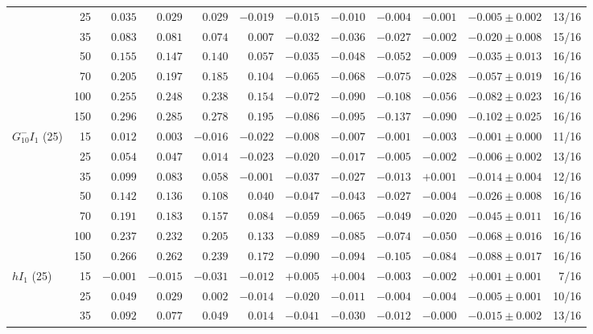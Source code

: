 \begin{tabular}{lrrrrrrrrrrr}
 & 25 & $0.035$ & $0.029$ & $0.029$ & $-0.019$ & $-0.015$ & $-0.010$ & $-0.004$ & $-0.001$ & $-0.005 \pm 0.002$ & 13/16 \\
 & 35 & $0.083$ & $0.081$ & $0.074$ & $0.007$ & $-0.032$ & $-0.036$ & $-0.027$ & $-0.002$ & $-0.020 \pm 0.008$ & 15/16 \\
 & 50 & $0.155$ & $0.147$ & $0.140$ & $0.057$ & $-0.035$ & $-0.048$ & $-0.052$ & $-0.009$ & $-0.035 \pm 0.013$ & 16/16 \\
 & 70 & $0.205$ & $0.197$ & $0.185$ & $0.104$ & $-0.065$ & $-0.068$ & $-0.075$ & $-0.028$ & $-0.057 \pm 0.019$ & 16/16 \\
 & 100 & $0.255$ & $0.248$ & $0.238$ & $0.154$ & $-0.072$ & $-0.090$ & $-0.108$ & $-0.056$ & $-0.082 \pm 0.023$ & 16/16 \\
 & 150 & $0.296$ & $0.285$ & $0.278$ & $0.195$ & $-0.086$ & $-0.095$ & $-0.137$ & $-0.090$ & $-0.102 \pm 0.025$ & 16/16 \\
\midrule
$G_{10}^{-}I_{1}$ (25) & 15 & $0.012$ & $0.003$ & $-0.016$ & $-0.022$ & $-0.008$ & $-0.007$ & $-0.001$ & $-0.003$ & $-0.001 \pm 0.000$ & 11/16 \\
 & 25 & $0.054$ & $0.047$ & $0.014$ & $-0.023$ & $-0.020$ & $-0.017$ & $-0.005$ & $-0.002$ & $-0.006 \pm 0.002$ & 13/16 \\
 & 35 & $0.099$ & $0.083$ & $0.058$ & $-0.001$ & $-0.037$ & $-0.027$ & $-0.013$ & $+0.001$ & $-0.014 \pm 0.004$ & 12/16 \\
 & 50 & $0.142$ & $0.136$ & $0.108$ & $0.040$ & $-0.047$ & $-0.043$ & $-0.027$ & $-0.004$ & $-0.026 \pm 0.008$ & 16/16 \\
 & 70 & $0.191$ & $0.183$ & $0.157$ & $0.084$ & $-0.059$ & $-0.065$ & $-0.049$ & $-0.020$ & $-0.045 \pm 0.011$ & 16/16 \\
 & 100 & $0.237$ & $0.232$ & $0.205$ & $0.133$ & $-0.089$ & $-0.085$ & $-0.074$ & $-0.050$ & $-0.068 \pm 0.016$ & 16/16 \\
 & 150 & $0.266$ & $0.262$ & $0.239$ & $0.172$ & $-0.090$ & $-0.094$ & $-0.105$ & $-0.084$ & $-0.088 \pm 0.017$ & 16/16 \\
\midrule
$hI_{1}$ (25) & 15 & $-0.001$ & $-0.015$ & $-0.031$ & $-0.012$ & $+0.005$ & $+0.004$ & $-0.003$ & $-0.002$ & $+0.001 \pm 0.001$ & 7/16 \\
 & 25 & $0.049$ & $0.029$ & $0.002$ & $-0.014$ & $-0.020$ & $-0.011$ & $-0.004$ & $-0.004$ & $-0.005 \pm 0.001$ & 10/16 \\
 & 35 & $0.092$ & $0.077$ & $0.049$ & $0.014$ & $-0.041$ & $-0.030$ & $-0.012$ & $-0.000$ & $-0.015 \pm 0.002$ & 13/16 \\

\end{tabular}

